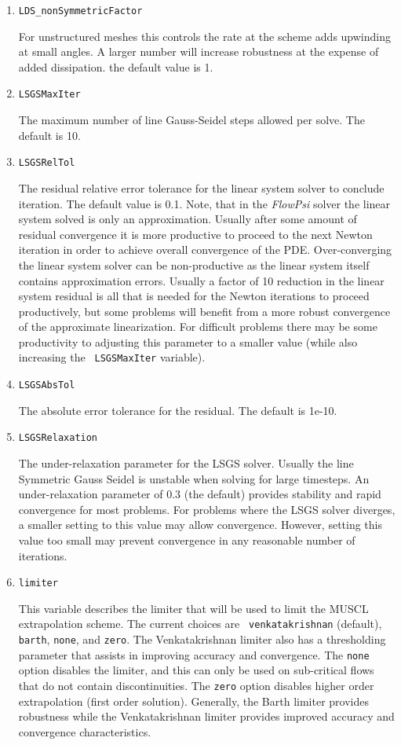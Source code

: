 \documentclass{article}
\begin{document}
\begin{enumerate}
\item {\tt LDS\_nonSymmetricFactor}

  For unstructured meshes this controls the rate at the scheme adds
  upwinding at small angles.  A larger number will increase robustness
  at the expense of added dissipation.  the default value is 1.

\item {\tt LSGSMaxIter} 

  The maximum number of line Gauss-Seidel steps
  allowed per solve. The default is 10.

\item {\tt LSGSRelTol} 

  The residual relative error tolerance for the linear system solver
  to conclude iteration.  The default value is 0.1.  Note, that in the
  {\em FlowPsi} solver the linear system solved is only an approximation.
  Usually after some amount of residual convergence it is more
  productive to proceed to the next Newton iteration in order to
  achieve overall convergence of the PDE.  Over-converging the linear
  system solver can be non-productive as the linear system itself
  contains approximation errors.  Usually a factor of 10 reduction in
  the linear system residual is all that is needed for the Newton
  iterations to proceed productively, but some problems will benefit
  from a more robust convergence of the approximate linearization.
  For difficult problems there may be some productivity to adjusting
  this parameter to a smaller value (while also increasing the {\tt
    LSGSMaxIter} variable).

\item {\tt LSGSAbsTol}

  The absolute error tolerance for the residual.  The default is 1e-10.

\item {\tt LSGSRelaxation}

  The under-relaxation parameter for the LSGS solver.  Usually the
  line Symmetric Gauss Seidel is unstable when solving for large
  timesteps.  An under-relaxation parameter of 0.3 (the default)
  provides stability and rapid convergence for most problems.  For
  problems where the LSGS solver diverges, a smaller setting to this
  value may allow convergence.  However, setting this value too small
  may prevent convergence in any reasonable number of iterations.

\item {\tt limiter }

  This variable describes the limiter that will be used to limit the
  MUSCL extrapolation scheme.  The current choices are {\tt
    venkatakrishnan} (default), {\tt barth}, {\tt none}, and {\tt zero}.  
  The Venkatakrishnan limiter also has a thresholding parameter
  that assists in improving accuracy and convergence.  The {\tt none}
  option disables the limiter, and this can only be used on
  sub-critical flows that do not contain discontinuities.  The
  {\tt zero} option disables higher order extrapolation (first order solution).
  Generally, the Barth limiter provides robustness while the Venkatakrishnan
  limiter provides improved accuracy and convergence characteristics.
  

\end{enumerate}
\end{document}
